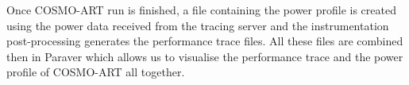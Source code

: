 Once COSMO-ART run is finished, a file containing the power profile is
created using the power data  received from the tracing server and the
instrumentation post-processing generates the performance trace files.
All  these files  are  combined then  in  Paraver which  allows us  to
visualise the performance trace and the power profile of COSMO-ART all
together.




